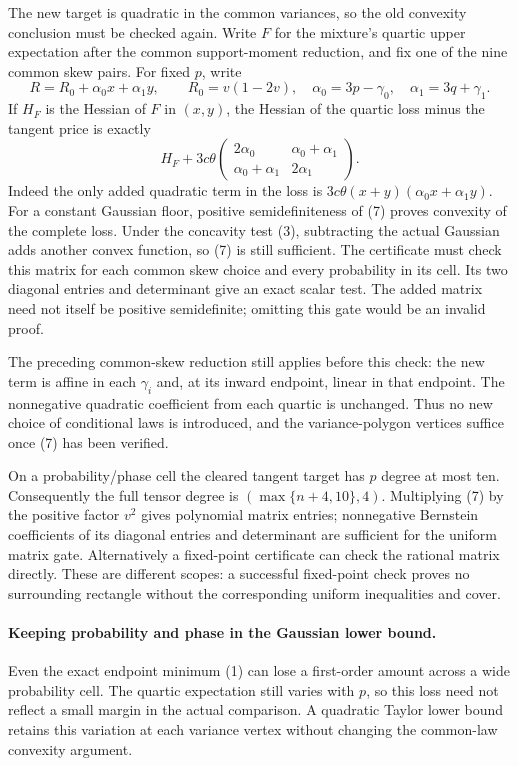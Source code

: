 \documentclass[11pt,a4paper]{article}
\begin{document}
The new target is quadratic in the common variances, so the old
convexity conclusion must be checked again. Write $F$ for the
mixture's quartic upper expectation after the common support-moment
reduction, and fix one of the nine common skew pairs. For fixed $p$,
write
\[
 R=R_0+\alpha_0x+\alpha_1y,\qquad
 R_0=v(1-2v),\quad \alpha_0=3p-\gamma_0,\quad \alpha_1=3q+\gamma_1.
\]
If $H_F$ is the Hessian of $F$ in $(x,y)$,
the Hessian of the quartic loss minus the tangent price is exactly
\[
 H_F+3c\theta
 \begin{pmatrix}2\alpha_0&\alpha_0+\alpha_1\\\alpha_0+\alpha_1&2\alpha_1\end{pmatrix}.
 \tag{7}
\]
Indeed the only added quadratic term in the loss is
$3c\theta(x+y)(\alpha_0x+\alpha_1y)$. For a constant Gaussian floor,
positive semidefiniteness of (7) proves convexity of the complete
loss. Under the concavity test (3), subtracting the actual Gaussian
adds another convex function, so (7) is still sufficient. The
certificate must check this matrix for each common skew choice and
every probability in its cell. Its two diagonal entries and determinant
give an exact scalar test. The added matrix need not itself be
positive semidefinite; omitting this gate would be an invalid proof.

The preceding common-skew reduction still applies before this check:
the new term is affine in each $\gamma_i$ and, at its inward endpoint,
linear in that endpoint. The nonnegative quadratic coefficient from
each quartic is unchanged. Thus no new choice of conditional laws
is introduced, and the variance-polygon vertices suffice once (7)
has been verified.

On a probability/phase cell the cleared tangent target has $p$ degree
at most ten. Consequently the full tensor degree is
$(\max\{n+4,10\},4)$. Multiplying (7) by the positive factor $v^2$
gives polynomial matrix entries; nonnegative Bernstein coefficients
of its diagonal entries and determinant are sufficient for the
uniform matrix gate. Alternatively a fixed-point certificate can
check the rational matrix directly. These are different scopes:
a successful fixed-point check proves no surrounding rectangle
without the corresponding uniform inequalities and cover.
\paragraph{Keeping probability and phase in the Gaussian lower bound.}
Even the exact endpoint minimum (1) can lose a first-order amount across
a wide probability cell. The quartic expectation still varies with $p$,
so this loss need not reflect a small margin in the actual comparison.
A quadratic Taylor lower bound retains this variation at each variance
vertex without changing the common-law convexity argument.
\end{document}
